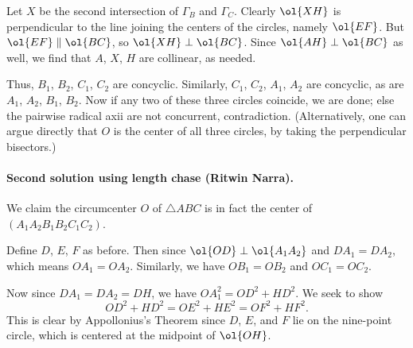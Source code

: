 Let $X$ be the second intersection of $\Gamma_B$ and $\Gamma_C$.
Clearly $\ol{XH}$ is perpendicular to the line
joining the centers of the circles, namely $\ol{EF}$.
But $\ol{EF} \parallel \ol{BC}$, so $\ol{XH} \perp \ol{BC}$.
Since $\ol{AH} \perp \ol{BC}$ as well,
we find that $A$, $X$, $H$ are collinear, as needed.

Thus, $B_1$, $B_2$, $C_1$, $C_2$ are concyclic.
Similarly, $C_1$, $C_2$, $A_1$, $A_2$ are concyclic,
as are $A_1$, $A_2$, $B_1$, $B_2$.
Now if any two of these three circles coincide, we are done;
else the pairwise radical axii are not concurrent, contradiction.
(Alternatively, one can argue directly that $O$ is the center of all
three circles, by taking the perpendicular bisectors.)

\paragraph{Second solution using length chase (Ritwin Narra).}
We claim the circumcenter $O$ of $\triangle ABC$
is in fact the center of $(A_1A_2B_1B_2C_1C_2)$.

Define $D$, $E$, $F$ as before.
Then since $\ol{OD} \perp \ol{A_1A_2}$ and $DA_1 = DA_2$,
which means $OA_1 = OA_2$. Similarly, we have $OB_1 = OB_2$ and $OC_1 = OC_2$.

Now since $DA_1 = DA_2 = DH$, we have $OA_1^2 = OD^2 + HD^2$.
We seek to show
\[ OD^2 + HD^2 = OE^2 + HE^2 = OF^2 + HF^2. \]
This is clear by Appollonius's Theorem
since $D$, $E$, and $F$ lie on the nine-point circle,
which is centered at the midpoint of $\ol{OH}$.
\pagebreak